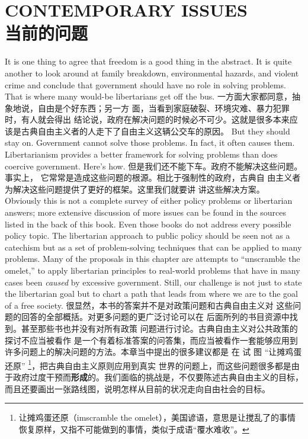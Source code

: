 \chapter{CONTEMPORARY ISSUES\\当前的问题}
\begin{paracol}{2}

It is one thing to agree that freedom is a good thing in
the abstract. It is quite another to look around at family breakdown, environmental hazards, and violent crime and
conclude that government should have no role in solving problems. That is where many would-be libertarians get off the bus.
\switchcolumn
一方面大家都同意，抽象地说，自由是个好东西；另一方
面，当看到家庭破裂、环境灾难、暴力犯罪时，有人就会得出
结论说，政府在解决问题的时候必不可少。这就是很多本来应
该是古典自由主义者的人走下了自由主义这辆公交车的原因。
\switchcolumn*
But they should stay on. Government cannot solve those
problems. In fact, it often causes them. Libertarianism provides
a better framework for solving problems than does coercive
government. Here's how.
\switchcolumn
但是我们还不能下车。政府不能解决这些问题。事实上，
它常常是造成这些问题的根源。相比于强制性的政府，古典自
由主义者为解决这些问题提供了更好的框架。这里我们就要讲
讲这些解决方案。
\switchcolumn*
Obviously this is not a complete survey of either policy problems or libertarian answers; more extensive discussion of more
issues can be found in the sources listed in the back of this
book. Even those books do not address every possible policy
topic. The libertarian approach to public policy should be seen
not as a catechism but as a set of problem-solving techniques
that can be applied to many problems. Many of the proposals
in this chapter are attempts to ``unscramble the omelet,'' to
apply libertarian principles to real-world problems that have in
many cases been \textit{caused} by excessive government. Still, our
challenge is not just to state the libertarian goal but to chart a
path that leads from where we are to the goal of a free society.
\switchcolumn
很显然，本书的答案并不是对政策问题和古典自由主义对
这些问题的回答的全部概括。对更多问题的更广泛讨论可以在
后面所列的书目资源中找到。甚至那些书也并没有对所有政策
问题进行讨论。古典自由主义对公共政策的探讨不应当被看作
是一个有着标准答案的问答集，而应当被看作一套能够应用到
许多问题上的解决问题的方法。本章当中提出的很多建议都是
在 试 图 “让摊鸡蛋还原” \footnote{让摊鸡蛋还原（imscramble the omelet），美国谚语，意思是让搅乱了的事情恢复原样，又指不可能做到的事情，类似于成语“覆水难收”。}，把古典自由主义原则应用到真实
世界的问题上，而这些问题很多都是由于政府过度干预而\textbf{形成}的。我们面临的挑战是，不仅要陈述古典自由主义的目标，而且还要画出一张路线图，说明怎样从目前的状况走向自由社会的目标。

\end{paracol}
